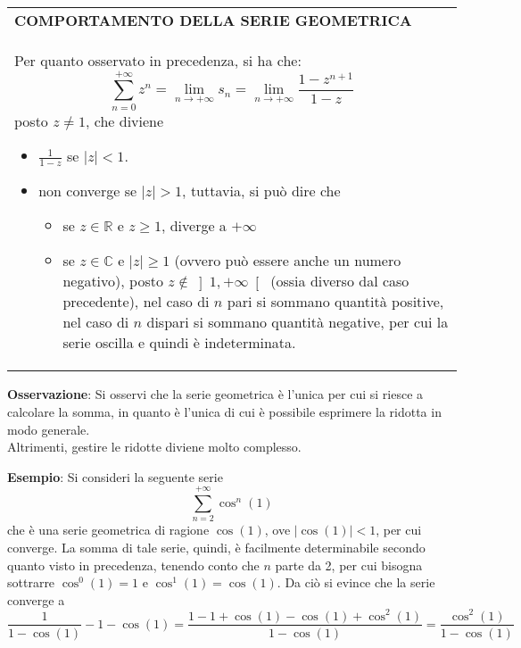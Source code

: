 \documentclass[a4paper]{extarticle}
\renewcommand\arraystretch{}
\begin{document}
\vspace{1em}
\setlength{\tabcolsep}{14pt}
\renewcommand{\arraystretch}{2}
\noindent
\begin{tabularx}{\textwidth}{@{}|P|@{}}
    \hline
    {\textbf{COMPORTAMENTO DELLA SERIE GEOMETRICA}}\\
    \parbox{\linewidth}{Per quanto osservato in precedenza, si ha che:
    \[\sum_{n=0}^{+\infty} z^n = \lim_{n \to +\infty} s_n = \lim_{n \to + \infty} \frac{1-z^{n+1}}{1-z}\]
    posto $z \neq 1$, che diviene
    \begin{itemize}
        \item $\displaystyle{\frac{1}{1-z}}$ se $\vert z \vert < 1$.
        \item non converge se $\vert z \vert > 1$, tuttavia, si può dire che
        \begin{itemize}
            \item se $z \in \mathbb{R}$ e $z \geq 1$, diverge a $+\infty$
            \item se $z \in \mathbb{C}$ e $\vert z \vert \geq 1$ (ovvero può essere anche un numero negativo), posto $z \notin \left]1,+\infty \right[$ (ossia diverso dal caso precedente), nel caso di $n$ pari si sommano quantità positive, nel caso di $n$ dispari si sommano quantità negative, per cui la serie oscilla e quindi è indeterminata.
        \end{itemize}
    \end{itemize}
    \vspace{1mm}}\\
    \hline
\end{tabularx}



\vspace{1em}
\noindent
\textbf{Osservazione}: Si osservi che la serie geometrica è l'unica per cui si riesce a calcolare la somma, in quanto è l'unica di cui è possibile esprimere la ridotta in modo generale.\\
Altrimenti, gestire le ridotte diviene molto complesso.

\vspace{1em}
\noindent
\textbf{Esempio}: Si consideri la seguente serie
\[\sum_{n=2}^{+\infty} \cos^{n}(1)\]
che è una serie geometrica di ragione $\cos(1)$, ove $\left \vert \cos(1) \right \vert < 1$, per cui converge. La somma di tale serie, quindi, è facilmente determinabile secondo quanto visto in precedenza, tenendo conto che $n$ parte da 2, per cui bisogna sottrarre $\cos^0(1)=1$ e $\cos^1(1)=\cos(1)$. Da ciò si evince che la serie converge a 
\[\frac{1}{1 - \cos(1)} - 1 - \cos(1) = \frac{1 - 1 + \cos(1) - \cos(1) + \cos^2(1)}{1 - \cos(1)} = \frac{\cos^2(1)}{1 - \cos(1)}\]
\end{document}
